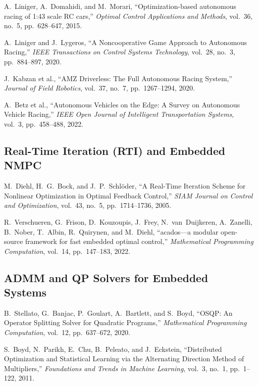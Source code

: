 \documentclass[12pt,a4paper]{article}
\begin{document}
\begin{enumerate}[label={[\arabic*]}]
    \item A.~Liniger, A.~Domahidi, and M.~Morari, ``Optimization-based autonomous racing of 1:43 scale RC cars,'' \textit{Optimal Control Applications and Methods}, vol.~36, no.~5, pp.~628--647, 2015.

    \item A.~Liniger and J.~Lygeros, ``A Noncooperative Game Approach to Autonomous Racing,'' \textit{IEEE Transactions on Control Systems Technology}, vol.~28, no.~3, pp.~884--897, 2020.

    \item J.~Kabzan et al., ``AMZ Driverless: The Full Autonomous Racing System,'' \textit{Journal of Field Robotics}, vol.~37, no.~7, pp.~1267--1294, 2020.

    \item A.~Betz et al., ``Autonomous Vehicles on the Edge: A Survey on Autonomous Vehicle Racing,'' \textit{IEEE Open Journal of Intelligent Transportation Systems}, vol.~3, pp.~458--488, 2022.
\end{enumerate}

\subsection{Real-Time Iteration (RTI) and Embedded NMPC}

\begin{enumerate}[resume, label={[\arabic*]}]
    \item M.~Diehl, H.~G.~Bock, and J.~P.~Schl\"oder, ``A Real-Time Iteration Scheme for Nonlinear Optimization in Optimal Feedback Control,'' \textit{SIAM Journal on Control and Optimization}, vol.~43, no.~5, pp.~1714--1736, 2005.

    \item R.~Verschueren, G.~Frison, D.~Kouzoupis, J.~Frey, N.~van~Duijkeren, A.~Zanelli, B.~Nober, T.~Albin, R.~Quirynen, and M.~Diehl, ``acados---a modular open-source framework for fast embedded optimal control,'' \textit{Mathematical Programming Computation}, vol.~14, pp.~147--183, 2022.
\end{enumerate}

\subsection{ADMM and QP Solvers for Embedded Systems}

\begin{enumerate}[resume, label={[\arabic*]}]
    \item B.~Stellato, G.~Banjac, P.~Goulart, A.~Bartlett, and S.~Boyd, ``OSQP: An Operator Splitting Solver for Quadratic Programs,'' \textit{Mathematical Programming Computation}, vol.~12, pp.~637--672, 2020.

    \item S.~Boyd, N.~Parikh, E.~Chu, B.~Peleato, and J.~Eckstein, ``Distributed Optimization and Statistical Learning via the Alternating Direction Method of Multipliers,'' \textit{Foundations and Trends in Machine Learning}, vol.~3, no.~1, pp.~1--122, 2011.
\end{enumerate}
\end{document}
